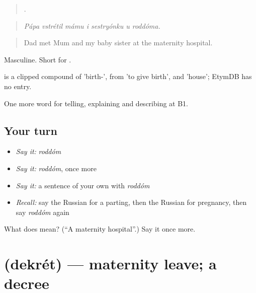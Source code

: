 \begin{quote}
      .
\end{quote}

\begin{quote}
\emph{Pápa vstrétil mámu i sestryónku u roddóma.}
\end{quote}

\begin{quote}
Dad met Mum and my baby sister at the maternity hospital.
\end{quote}

Masculine. Short for \emph{ }.

\begin{cousinweb}
\emph{} is a clipped compound of \emph{} 'birth-', from \emph{} 'to give birth', and \emph{} 'house'; EtymDB has no entry.
\end{cousinweb}

\begin{grammarlens}[title={What you've built}]
One more word for telling, explaining and describing at B1.
\end{grammarlens}

\subsection*{Your turn}
\begin{itemize}
\raggedright
  \item \emph{Say it:} \emph{roddóm}
  \item \emph{Say it:} \emph{roddóm}, once more
  \item \emph{Say it:} a sentence of your own with \emph{roddóm}
  \item \emph{Recall:} say the Russian for a parting, then the Russian for pregnancy, then say \emph{roddóm} again
\end{itemize}

\begin{tcolorbox}[breakable,colback=teal!4,colframe=teal!35!black,title={Before you move on}]
What does  mean? (\textquotedblleft{}A maternity hospital\textquotedblright{}.) Say it once more.
\end{tcolorbox}
\section[\texorpdfstring{\ru{декрет} (dekrét)}{декрет (dekrét)}]{ (dekrét) — maternity leave; a decree}

